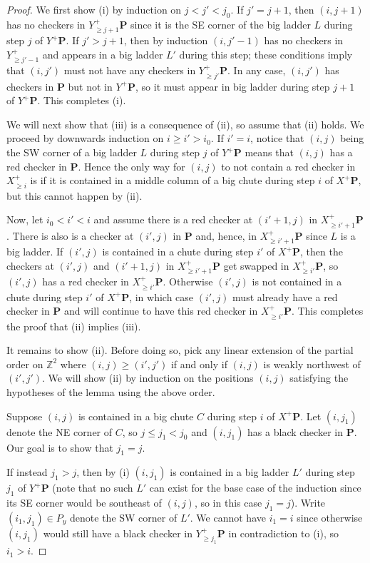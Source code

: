 \documentclass[10pt,a4paper]{amsart}
\newcommand{\bbZ}{\mathbb{Z}}
\newcommand{\bfP}{\mathbf{P}}
\begin{document}
\begin{proof}
We first show (i) by induction on $j< j'< j_0$.
If $j' = j+1$, then $(i,j+1)$ has no checkers in $Y^+_{\geq j+1} \bfP$ since it is the SE corner of the big ladder $L$ during step $j$ of $Y^+\bfP$.
If $j' > j+1$, then by induction $(i,j'-1)$ has no checkers in $Y^+_{\geq j'-1}$ and appears in a big ladder $L'$ during this step; these conditions imply that $(i,j')$ must not have any checkers in $Y^+_{\geq j'}\bfP$.
In any case, $(i,j')$ has checkers in $\bfP$ but not in $Y^+\bfP$, so it must appear in big ladder during step $j+1$ of $Y^+\bfP$.
This completes (i).

We will next show that (iii) is a consequence of (ii), so assume that (ii) holds.
We proceed by downwards induction on $i\geq i'> i_0$.
If $i' = i$, notice that $(i,j)$ being the SW corner of a big ladder $L$ during step $j$ of $Y^+\bfP$ means that $(i,j)$ has a red checker in $\bfP$.
Hence the only way for $(i,j)$ to not contain a red checker in $X^+_{\geq i}$ is if it is contained in a middle column of a big chute during step $i$ of $X^+\bfP$, but this cannot happen by (ii).

Now, let $i_0<i'<i$ and assume there is a red checker at $(i'+1,j)$ in $X^+_{\geq i'+1}\bfP$.
There is also is a checker at $(i',j)$ in $\bfP$ and, hence, in $X^+_{\geq i'+1}\bfP$ since $L$ is a big ladder.
If $(i',j)$ is contained in a chute during step $i'$ of $X^+\bfP$, then the checkers at $(i',j)$ and $(i'+1,j)$ in $X^+_{\geq i'+1}\bfP$ get swapped in $X^+_{\geq i'}\bfP$, so $(i',j)$ has a red checker in $X^+_{\geq i'}\bfP$.
Otherwise $(i',j)$ is not contained in a chute during step $i'$ of $X^+\bfP$, in which case $(i',j)$ must already have a red checker in $\bfP$ and will continue to have this red checker in $X^+_{\geq i'}\bfP$.
This completes the proof that (ii) implies (iii).

It remains to show (ii).
Before doing so, pick any linear extension of the partial order on $\bbZ^2$ where $(i,j)\geq (i',j')$ if and only if $(i,j)$ is weakly northwest of $(i',j')$.
We will show (ii) by induction on the positions $(i,j)$ satisfying the hypotheses of the lemma using the above order.

Suppose $(i,j)$ is contained in a big chute $C$ during step $i$ of $X^+\bfP$.
Let $(i,j_1)$ denote the NE corner of $C$, so $j\leq j_1< j_0$ and $(i,j_1)$ has a black checker in $\bfP$.
Our goal is to show that $j_1=j$.

If instead $j_1> j$, then by (i) $(i,j_1)$ is contained in a big ladder $L'$ during step $j_1$ of $Y^+\bfP$ (note that no such $L'$ can exist for the base case of the induction since its SE corner would be southeast of $(i,j)$, so in this case $j_1 = j$).
Write $(i_1,j_1)\in P_y$ denote the SW corner of $L'$.
We cannot have $i_1 = i$ since otherwise $(i,j_1)$ would still have a black checker in $Y^+_{\geq j_1}\bfP$ in contradiction to (i), so $i_1 > i$.


\end{proof}
\end{document}
